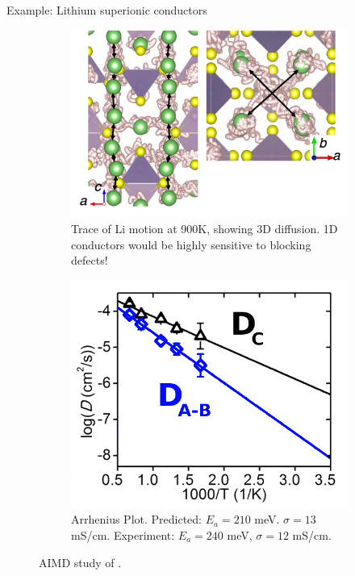 \documentclass[aspectratio=169]{beamer}
\begin{document}
    \begin{frame}{Example: Lithium superionic conductors}
        \begin{figure}
            \centering
            \begin{subfigure}{0.45\textwidth}
                \centering
                \includegraphics[width=0.9\linewidth]{lectures/figures/13-LGPS_1.png}
                \caption{Trace of Li motion at 900K, showing 3D diffusion. 1D conductors would be highly sensitive to blocking defects!}
            \end{subfigure}
            \begin{subfigure}{0.45\textwidth}
                \centering
                \includegraphics[width=0.8\linewidth]{lectures/figures/13-LGPS_2.png}
                \caption{Arrhenius Plot. Predicted: $E_a = 210$ meV. $\sigma = 13$ mS/cm. Experiment\cite{kamayaLithiumSuperionicConductor2011}: $E_a = 240$ meV, $\sigma = 12$ mS/cm.
                }
            \end{subfigure}
            \caption{AIMD study of .\cite{moFirstPrinciplesStudy2012}}
        \end{figure}
    \end{frame}
\end{document}
